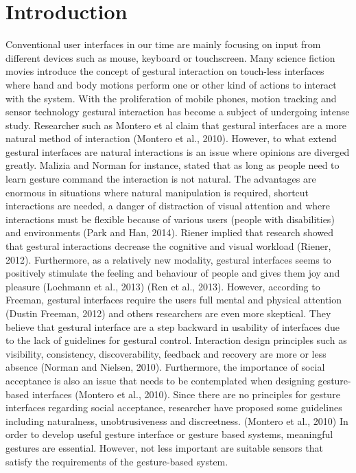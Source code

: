 \chapter{Introduction}
\label{chap:introduction}


Conventional user interfaces in our time are mainly focusing on input from different devices such as mouse, keyboard or touchscreen. Many science fiction movies introduce the concept of gestural interaction on touch-less interfaces where hand and body motions perform one or other kind of actions to interact with the system. With the proliferation of mobile phones, motion tracking and sensor technology gestural interaction has become a subject of undergoing intense study. Researcher such as Montero et al claim that gestural interfaces are a more natural method of interaction (Montero et al., 2010). However, to what extend gestural interfaces are natural interactions is an issue where opinions are diverged greatly. Malizia and Norman for instance, stated that as long as people need to learn gesture command the interaction is not natural. The advantages are enormous in situations where natural manipulation is required, shortcut interactions are needed, a danger of distraction of visual attention and where interactions must be flexible because of various users (people with disabilities) and environments (Park and Han, 2014). Riener implied that research showed that gestural interactions decrease the cognitive and visual workload (Riener, 2012). Furthermore, as a relatively new modality, gestural interfaces seems to positively stimulate the feeling and behaviour of people and gives them joy and pleasure (Loehmann et al., 2013) (Ren et al., 2013). However, according to Freeman, gestural interfaces require the users full mental and physical attention (Dustin Freeman, 2012) and others researchers are even more skeptical. They believe that gestural interface are a step backward in usability of interfaces due to the lack of guidelines for gestural control. Interaction design principles such as visibility, consistency, discoverability, feedback and recovery are more or less absence  (Norman and Nielsen, 2010). Furthermore, the importance of social acceptance is also an issue that needs to be contemplated when designing gesture-based interfaces (Montero et al., 2010). Since there are no principles for gesture interfaces regarding social acceptance, researcher have proposed some guidelines including naturalness, unobtrusiveness and discreetness. (Montero et al., 2010) 
\newline
In order to develop useful gesture interface or gesture based systems, meaningful gestures are essential. However, not less important are suitable sensors that satisfy the requirements of the gesture-based system.
